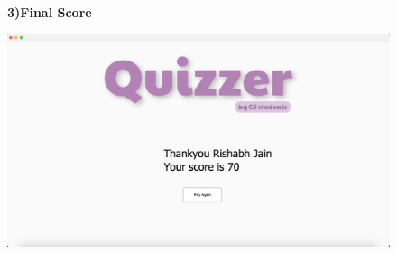 \documentclass{article}
\begin{document}
\begin{figure}[h]
\begin{center}
\textbf{3)Final Score}
\end{center}
\centering
\includegraphics[width=1.0\textwidth]{Score.png}
\label{fig:Score}
\end{figure}
\end{document}
